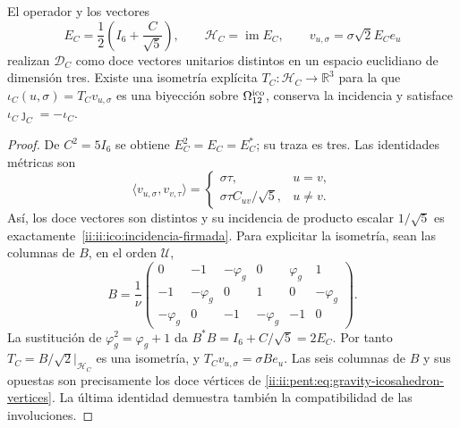 \begin{proposition}
\label{ii:ii:ico:realizacion-firmada}
El operador y los vectores
\begin{equation}
 E_C=\frac12\left(I_6+\frac C{\sqrt5}\right),\qquad
 \mathcal H_C=\operatorname{im}E_C,\qquad
 v_{u,\sigma}=\sigma\sqrt2 E_Ce_u
 \label{ii:ii:ico:proyector-seis}
\end{equation}
realizan \(\mathcal D_C\) como doce vectores unitarios distintos en un
espacio euclidiano de dimensión tres. Existe una isometría explícita
\(T_C:\mathcal H_C\to\mathbb R^3\) para la que
\(\iota_C(u,\sigma)=T_Cv_{u,\sigma}\) es una biyección sobre
\(\Omega_{12}^{\rm ico}\), conserva la incidencia y satisface
\(\iota_C\jmath_C=-\iota_C\).
\end{proposition}
\begin{proof}
De \(C^2=5I_6\) se obtiene \(E_C^2=E_C=E_C^*\); su traza es tres.
Las identidades métricas son
\[
 \langle v_{u,\sigma},v_{v,\tau}\rangle
 =\begin{cases}\sigma\tau,&u=v,\\
 \sigma\tau C_{uv}/\sqrt5,&u\ne v.
 \end{cases}
\]
Así, los doce vectores son distintos y su incidencia de producto escalar
\(1/\sqrt5\) es exactamente~\eqref{ii:ii:ico:incidencia-firmada}.
Para explicitar la isometría, sean las columnas de \(B\), en el orden
\(\mathcal U\),
\[
 B=\frac1\nu
 \begin{pmatrix}
 0&-1&-\varphi_g&0&\varphi_g&1\\
 -1&-\varphi_g&0&1&0&-\varphi_g\\
 -\varphi_g&0&-1&-\varphi_g&-1&0
 \end{pmatrix}.
\]
La sustitución de \(\varphi_g^2=\varphi_g+1\) da
\(B^*B=I_6+C/\sqrt5=2E_C\). Por tanto
\(T_C=B/\sqrt2\big|_{\mathcal H_C}\) es una isometría, y
\(T_Cv_{u,\sigma}=\sigma Be_u\). Las seis columnas de \(B\) y sus
opuestas son precisamente los doce vértices de
\eqref{ii:ii:pent:eq:gravity-icosahedron-vertices}. La última identidad
demuestra también la compatibilidad de las involuciones.
\end{proof}

